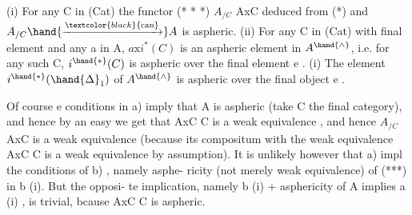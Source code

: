 
(i)   For any C in (Cat)  the functor
(* * *)   $A_{/C}$ \hand{\ensuremath{\longrightarrow}} AxC   deduced from (*)  and $A_{/C} \hand{\ensuremath{\xrightarrow{\textcolor{black}{\text{can}}}}} A$
   is aspheric.
(ii)  For any C in (Cat) with final element and any a in A,  $a\mathrm{x}i^{*}(C)$ is
an aspheric element in $A^{\hand{\wedge}}$, i.e. for any such C, $i^{\hand{*}}(C)$ is aspheric
over the final element e .
(i)   The element  $i^{\hand{*}}(\hand{\ensuremath{\Delta}}_1)$ of $A^{\hand{\wedge}}$ is aspheric over the final object e .

Of course e conditions in a) imply that A is aspheric (take  C
the final category),  and hence  by an easy 
we get that  AxC \hand{\ensuremath{\rightarrow}} C is a weak equivalence , and hence $A_{/C}$ \hand{\ensuremath{\rightarrow}} AxC is
a weak equivalence (because its compositum with the weak equivalence
AxC \hand{\ensuremath{\rightarrow}} C is a weak equivalence by assumption).  It is  unlikely however
that  a)   impl the conditions of  b) ,  namely asphe-%
ricity (not merely weak equivalence) of (***) in  b (i).   But the opposi-%
te implication,  namely  b (i)  +  asphericity of A   implies a (i) ,
is trivial,  bcause AxC \hand{\ensuremath{\rightarrow}} C is aspheric.

